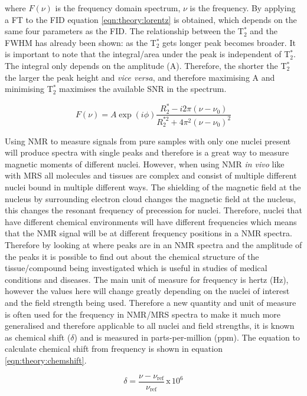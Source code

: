 \noindent where $F(\nu)$ is the frequency domain spectrum, $\nu$ is the frequency. By applying a \ac{FT} to the \ac{FID} equation \ref{eqn:theory:lorentz} is obtained, which depends on the same four parameters as the \ac{FID}. The relationship between the T$_2^*$ and the FWHM has already been shown: as the T$_2^*$ gets longer peak becomes broader. It is important to note that the integral/area under the peak is independent of T$_2^*$. The integral only depends on the amplitude (A). Therefore, the shorter the T$_2^*$ the larger the peak height and \textit{vice versa}, and therefore maximising A and minimising T$_2^*$ maximises the available \ac{SNR} in the spectrum.

\begin{equation}
    F(\nu) = A\exp(i\phi)\frac{R_2^*-i2\pi(\nu-\nu_0)}{R_2^{*2}+4\pi^2(\nu-\nu_0)^2}
    \label{eqn:theory:lorentz}
\end{equation}

Using \ac{NMR} to measure signals from pure samples with only one nuclei present will produce spectra with single peaks and therefore is a great way to measure magnetic moments of different nuclei. However, when using \ac{NMR} \textit{in vivo} like with \ac{MRS} all molecules and tissues are complex and consist of multiple different nuclei bound in multiple different ways. The shielding of the magnetic field at the nucleus by surrounding electron cloud changes the magnetic field at the nucleus, this changes the resonant frequency of precession for nuclei. Therefore, nuclei that have different chemical environments will have different frequencies which means that the \ac{NMR} signal will be at different frequency positions in a \ac{NMR} spectra. Therefore by looking at where peaks are in an \ac{NMR} spectra and the amplitude of the peaks it is possible to find out about the chemical structure of the tissue/compound being investigated which is useful in studies of medical conditions and diseases. The main unit of measure for frequency is hertz (Hz), however the values here will change greatly depending on the nuclei of interest and the field strength being used. Therefore a new quantity and unit of measure is often used for the frequency in NMR/\ac{MRS} spectra to make it much more generalised and therefore applicable to all nuclei and field strengths, it is known as chemical shift ($\delta$) and is measured in parts-per-million (ppm). The equation to calculate chemical shift from frequency is shown in equation \ref{eqn:theory:chemshift}.

\begin{equation}
    \delta = \frac{\nu - \nu_{\textrm{ref}}}{\nu_\textrm{ref}} \, \textrm{x} \, 10^6
    \label{eqn:theory:chemshift}
\end{equation}

